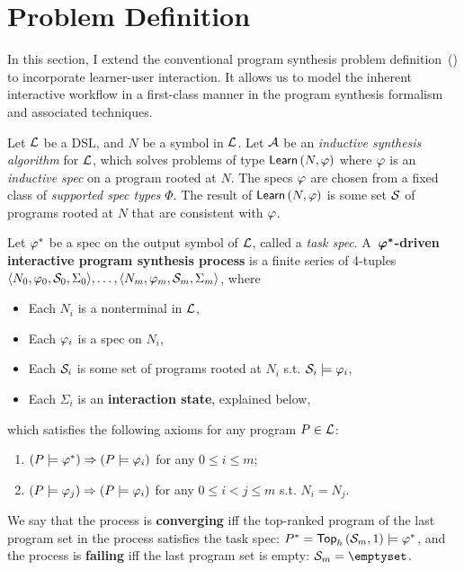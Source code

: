\section{Problem Definition}
\label{sec:interactive:problem}

In this section, I extend the conventional program synthesis problem definition~() to
incorporate learner-user interaction.
It allows us to model the inherent interactive workflow in a first-class manner in the program synthesis formalism and
associated techniques.

\begin{problem}
    Let $\mathcal{L}$ be a DSL, and $N$ be a symbol in $\mathcal{L}$.
    Let $\mathcal{A}$ be an \emph{inductive synthesis algorithm} for $\mathcal{L}$, which solves problems of type
    $\mathsf{Learn}\left(N, \varphi\right)$ where $\varphi$ is an \emph{inductive spec} on a program rooted at $N$.
    The specs $\varphi$ are chosen from a fixed class of \emph{supported spec types} $\Phi$.
    The result of $\mathsf{Learn}\left(N, \varphi\right)$ is some set $\mathcal{S}$ of programs rooted at $N$ that are consistent
    with $\varphi$.

    Let $\varphi^{*}$ be a spec on the output symbol of $\mathcal{L}$, called a \emph{task spec}.
    A~\textbf{$\bm{\varphi^{*}}$-driven interactive program synthesis process} is a finite series of 4-tuples
    $\langle N_0, \varphi_0, \mathcal{S}_0, \Sigma_0\rangle, \dots, \langle N_m, \varphi_m, \mathcal{S}_m, \Sigma_m\rangle$, where
    \begin{itemize}[nosep]
        \item Each $N_i$ is a nonterminal in $\mathcal{L}$,
        \item Each $\varphi_i$ is a spec on $N_i$,
        \item Each $\mathcal{S}_i$ is some set of programs rooted at $N_i$ s.t. $\mathcal{S}_i \models \varphi_i$,
        \item Each $\Sigma_i$ is an \textbf{interaction state}, explained below,
    \end{itemize}
    which satisfies the following axioms for any program $P \in \mathcal{L}$:
    \begin{enumerate}[nosep, label=\textbf{\Alph*.}]
        \item $(P \models \varphi^{*}) \Rightarrow (P \models \varphi_i)$ for any $0 \le i \le m$;
        \item $(P \models \varphi_j) \Rightarrow (P \models \varphi_i)$ for any $0 \le i < j \le m$ s.t. $N_i = N_j$.
    \end{enumerate}
    We say that the process is \textbf{converging} iff the top-ranked program of the last program set in the process
    satisfies the task spec: $P^{*} = \mathsf{Top}_h\left(\mathcal{S}_m, 1\right) \models \varphi^{*}$,
    and the process is \textbf{failing} iff the last program set is empty: $\vsa_m = \emptyset$.


\end{problem}

